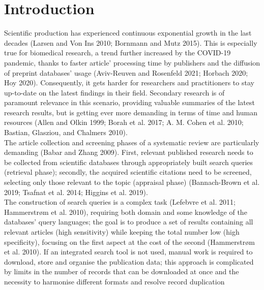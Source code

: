 \documentclass{article}
\begin{document}

\hypertarget{introduction}{%
\section{Introduction}\label{introduction}}

Scientific production has experienced continuous exponential growth in
the last decades (Larsen and Von Ins 2010; Bornmann and Mutz 2015). This
is especially true for biomedical research, a trend further increased by
the COVID-19 pandemic, thanks to faster article' processing time by
publishers and the diffusion of preprint databases' usage (Aviv-Reuven
and Rosenfeld 2021; Horbach 2020; Hoy 2020). Consequently, it gets
harder for researchers and practitioners to stay up-to-date on the
latest findings in their field. Secondary research is of paramount
relevance in this scenario, providing valuable summaries of the latest
research results, but is getting ever more demanding in terms of time
and human resources (Allen and Olkin 1999; Borah et al. 2017; A. M.
Cohen et al. 2010; Bastian, Glasziou, and Chalmers 2010).\\
The article collection and screening phases of a systematic review are
particularly demanding (Babar and Zhang 2009). First, relevant published
research needs to be collected from scientific databases through
appropriately built search queries (retrieval phase); secondly, the
acquired scientific citations need to be screened, selecting only those
relevant to the topic (appraisal phase) (Bannach-Brown et al. 2019;
Tsafnat et al. 2014; Higgins et al. 2019).\\
The construction of search queries is a complex task (Lefebvre et al.
2011; Hammerstrøm et al. 2010), requiring both domain and some knowledge
of the databases' query languages; the goal is to produce a set of
results containing all relevant articles (high sensitivity) while
keeping the total number low (high specificity), focusing on the first
aspect at the cost of the second (Hammerstrøm et al. 2010). If an
integrated search tool is not used, manual work is required to download,
store and organise the publication data; this approach is complicated by
limits in the number of records that can be downloaded at once and the
necessity to harmonise different formats and resolve record duplication
\end{document}
